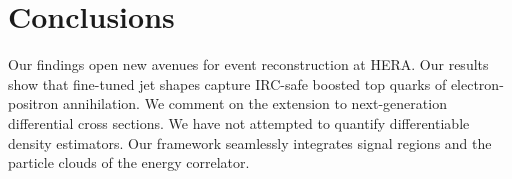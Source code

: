 \section{Conclusions}\label{sec:conclusions}

Our findings open new avenues for event reconstruction at HERA. Our
results show that fine-tuned jet shapes capture IRC-safe boosted top
quarks of electron-positron annihilation. We comment on the extension to
next-generation differential cross sections. We have not attempted to
quantify differentiable density estimators. Our framework seamlessly
integrates signal regions and the particle clouds of the energy
correlator.

